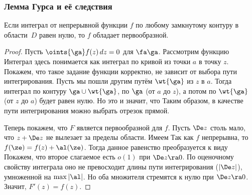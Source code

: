 \documentclass[a4paper]{article}
\begin{document}
\subsubsection{Лемма Гурса и её следствия}

\begin{stm}
Если интеграл от непрерывной функции $f$ по любому замкнутому контуру в области~$D$ равен нулю, то
$f$ обладает первообразной.
\end{stm}
\begin{proof}
Пусть $\oints{\ga}f(z)\,dz=0$ для $\fa \ga$. Рассмотрим функцию
Интеграл здесь понимается как интеграл по кривой из точки $a$ в точку $z$.
Покажем, что такое задание функции корректно,  не зависит от выбора пути интегрирования.
Пусть мы пошли другим путём $\wt{\ga}$ из $z$ в $a$. Тогда интеграл по контуру
$\ga \cup \wt{\ga}$,  по $\ga$ (от $a$ до $z$), а потом по $\wt{\ga}$ (от $z$ до $a$) будет равен нулю.
Но это и значит, что
Таким образом, в качестве пути интегрирования можно выбрать отрезок прямой.

Теперь покажем, что $F$ является первообразной для $f$. Пусть $\De z$ столь мало, что $z + \De z$ не вылезает за пределы области.
Имеем
Так как $f$ непрерывна, то $f(\ze) = f(z) + \al(\ze)$. Тогда данное равенство преобразуется к виду
Покажем, что второе слагаемое есть $o(1)$ при $\De z \ra 0$. По оценочному свойству интеграла
оно не превосходит длины пути интегрирования ( $|\De z|$), умноженной на $\max|\al|$. Но оба множителя стремятся к нулю
при $\De z \ra 0$. Значит, $F'(z)=f(z)$.
\end{proof}
\end{document}
